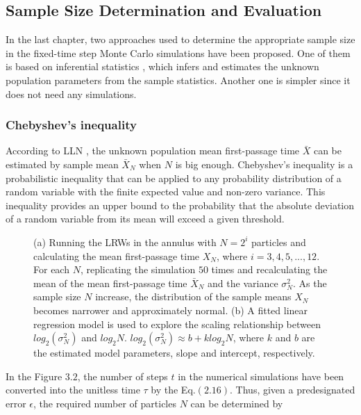 \subsection{Sample Size Determination and Evaluation}

In the last chapter, two approaches used to determine the appropriate
sample size in the fixed-time step Monte Carlo simulations have been
proposed. One of them is based on inferential statistics
\cite{casella2002statistical}, which infers and estimates the unknown
population parameters from the sample statistics. Another one is
simpler since it does not need any simulations.

\subsubsection{Chebyshev's inequality}

According to LLN \cite{dekking2005modern}, the unknown population mean
first-passage time $\bar X$ can be estimated by sample mean $\bar X_N$
when $N$ is big enough. Chebyshev’s inequality
\cite{chebyshev1867valeurs} is a probabilistic inequality that can be
applied to any probability distribution of a random variable with the
finite expected value and non-zero variance. This inequality provides
an upper bound to the probability that the absolute deviation of a
random variable from its mean will exceed a given threshold.

\clearpage


\begin{figure}[h!]
  \centering
  \caption{(a) Running the LRWs in the annulus with $N = 2^i$
    particles and calculating the mean first-passage time $X_N$, where
    $i=3, 4, 5, ..., 12$. For each $N$, replicating the simulation
    $50$ times and recalculating the mean of the mean first-passage
    time $\bar X_{N}$ and the variance $\sigma^2_{N}$. As the sample
    size $N$ increase, the distribution of the sample means $X_N$
    becomes narrower and approximately normal. (b) A fitted linear
    regression model is used to explore the scaling relationship
    between $log_{2} (\sigma^2_{N})$ and $log_{2} N$. $log_{2}
    (\sigma^2_{N}) \approx b + k log_{2} N$, where $k$ and $b$ are the
    estimated model parameters, slope and intercept, respectively.}
\end{figure}

In the Figure $3.2$, the number of steps $t$ in the numerical
simulations have been converted into the unitless time $\tau$ by the
Eq.$(2.16)$. Thus, given a predesignated error $\epsilon$, the
required number of particles $N$ can be determined by

